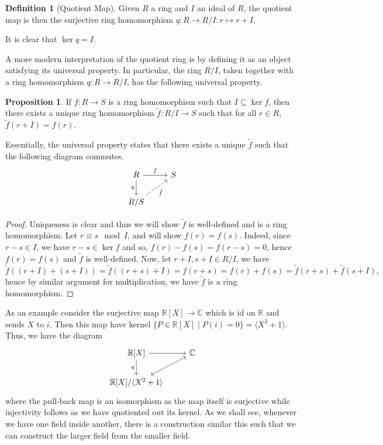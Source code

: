 \documentclass[]{article}
\theoremstyle{definition}
\theoremstyle{definition}
\newtheorem{definition}{Definition}[section]
\newtheorem{proposition}{Proposition}[section]
\begin{document}
\begin{definition}[Quotient Map]
  Given \(R\) a ring and \(I\) an ideal of \(R\), the quotient map is then the 
  surjective ring homomorphism \(q : R \to R / I : r \mapsto r + I\).
\end{definition}

It is clear that \(\ker q = I\).

A more modern interpretation of the quotient ring is by defining it as an 
object satisfying its universal property. In particular, the ring \(R / I\),
taken together with a ring homomorphism \(q : R \to R / I\), has the following 
universal property.

\begin{proposition}
  If \(f : R \to S\) is a ring homomorphism such that \(I \subseteq \ker f\), 
  then there exists a unique ring homomorphism \(\tilde f : R / I \to S\)
  such that for all \(r \in R\), \(\tilde f(r + I) = f(r)\).
\end{proposition}

Essentially, the universal property states that there exists a unique \(\tilde f\) 
such that the following diagram commutes.
\[\begin{tikzcd}
  R \arrow[r, "f"] \arrow[swap, d, "q"] & S \\
  R / S \arrow[swap, dashed, ru, "\tilde f"]
  \end{tikzcd}\]
\begin{proof}
  Uniqueness is clear and thus we will show \(\tilde f\) is well-defined and 
  is a ring homomorphism. Let \(r \equiv s \mod I\), and will show \(f(r) = f(s)\). 
  Indeed, since \(r - s \in I\), we have \(r - s \in \ker f\) and so, 
  \(f(r) - f(s) = f(r - s) = 0\), hence \(f(r) = f(s)\) and \(\tilde f\) is 
  well-defined. Now, let \(r + I, s + I \in R / I\), we have 
  \[\tilde f((r + I) + (s + I)) = \tilde f((r + s) + I) = f(r + s) = 
    f(r) + f(s) = \tilde f(r + s) + \tilde f(s + I),\]
  hence by similar argument for multiplication, we have \(\tilde f\) is a ring 
  homomorphism.
\end{proof}

As an example consider the surjective map \(\mathbb{R}[X] \to \mathbb{C}\) 
which is \(\text{id}\) on \(\mathbb{R}\) and sends \(X\) to \(i\). Then 
this map have kernel \(\{P \in \mathbb{R}[X] \mid P(i) = 0\} = 
\langle X^2 + 1 \rangle\). Thus, we have the diagram 
\[\begin{tikzcd}
  \mathbb{R}[X] \arrow[d, swap, "q"] \arrow[r] & \mathbb{C}\\
  \mathbb{R}[X] / \langle X^2 + 1 \rangle \arrow[swap, leftrightarrow, ru]
\end{tikzcd}\]
where the pull-back map is an isomorphism as the map itself is surjective while 
injectivity follows as we have quotiented out its kernel. As we shall see, 
whenever we have one field inside another, there is a construction similar this 
such that we can construct the larger field from the smaller field.
\end{document}
